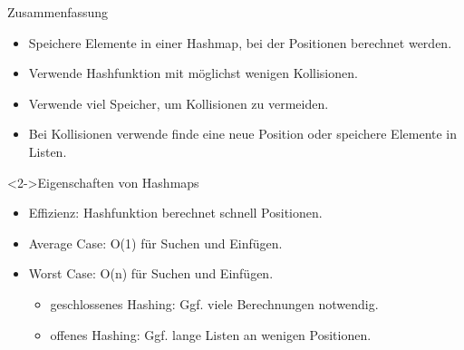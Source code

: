 \begin{frame}
\begin{block}{Zusammenfassung}
    \begin{itemize}
        \item Speichere Elemente in einer Hashmap, bei der Positionen berechnet werden.
        \item Verwende Hashfunktion mit möglichst wenigen Kollisionen.
        \item Verwende viel Speicher, um Kollisionen zu vermeiden.
        \item Bei Kollisionen verwende finde eine neue Position oder speichere Elemente in Listen.
    \end{itemize}
\end{block}
\begin{block}<2->{Eigenschaften von Hashmaps}
    \begin{itemize}
        \item \alert{Effizienz}: Hashfunktion berechnet schnell Positionen.
        \item Average Case: \alert{O(1)} für Suchen und Einfügen.
        \item Worst Case: \alert{O(n)} für Suchen und Einfügen.
        \begin{itemize}
            \item geschlossenes Hashing: Ggf. viele Berechnungen notwendig.
            \item offenes Hashing: Ggf. lange Listen an wenigen Positionen.
        \end{itemize}
    \end{itemize}
\end{block}
    

\end{frame}